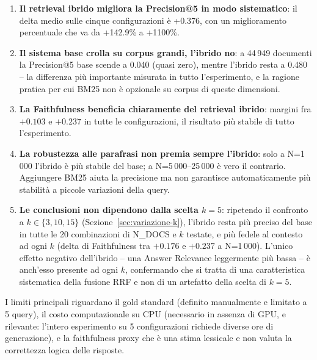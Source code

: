 \documentclass[12pt,a4paper]{article}
\begin{document}
\begin{enumerate}
  \item \textbf{Il retrieval ibrido migliora la Precision@5 in modo sistematico}: il delta medio sulle cinque configurazioni \`e +0.376, con un miglioramento percentuale che va da +142.9\% a +1100\%.

  \item \textbf{Il sistema base crolla su corpus grandi, l'ibrido no}: a 44\,949 documenti la Precision@5 base scende a 0.040 (quasi zero), mentre l'ibrido resta a 0.480 -- la differenza pi\`u importante misurata in tutto l'esperimento, e la ragione pratica per cui BM25 non \`e opzionale su corpus di queste dimensioni.

  \item \textbf{La Faithfulness beneficia chiaramente del retrieval ibrido}: margini fra $+0.103$ e $+0.237$ in tutte le configurazioni, il risultato pi\`u stabile di tutto l'esperimento.

  \item \textbf{La robustezza alle parafrasi non premia sempre l'ibrido}: solo a N=1\,000 l'ibrido \`e pi\`u stabile del base; a N=5\,000--25\,000 \`e vero il contrario. Aggiungere BM25 aiuta la precisione ma non garantisce automaticamente pi\`u stabilit\`a a piccole variazioni della query.

  \item \textbf{Le conclusioni non dipendono dalla scelta $k=5$}: ripetendo il confronto a $k \in \{3, 10, 15\}$ (Sezione~\ref{sec:variazione-k}), l'ibrido resta pi\`u preciso del base in tutte le 20 combinazioni di N\_DOCS e $k$ testate, e pi\`u fedele al contesto ad ogni $k$ (delta di Faithfulness tra $+0.176$ e $+0.237$ a N=1\,000). L'unico effetto negativo dell'ibrido -- una Answer Relevance leggermente pi\`u bassa -- \`e anch'esso presente ad ogni $k$, confermando che si tratta di una caratteristica sistematica della fusione RRF e non di un artefatto della scelta di $k=5$.
\end{enumerate}

I limiti principali riguardano il gold standard (definito manualmente e limitato a 5 query), il costo computazionale su CPU (necessario in assenza di GPU, e rilevante: l'intero esperimento su 5 configurazioni richiede diverse ore di generazione), e la faithfulness proxy che \`e una stima lessicale e non valuta la correttezza logica delle risposte.
\end{document}
